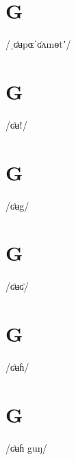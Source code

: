 \documentclass[10pt,a4paper,twoside]{book}
\begin{document}
\section*{G}

\begin{multicols}{3}
 {/ˌʛʉpɶˈʛʌmɵtʼ/} {}
\end{multicols}

\section*{G}

\begin{multicols}{3}
 {/ʛʉǃ/} {}
\end{multicols}

\section*{G}

\begin{multicols}{3}
 {/ʛʉg/} {}
\end{multicols}

\section*{G}

\begin{multicols}{3}
 {/ʛʉʛ/} {}
\end{multicols}

\section*{G}

\begin{multicols}{3}
 {/ʛʉɦ/} {}
\end{multicols}

\section*{G}

\begin{multicols}{3}
 {/ʛʉɦ guŋ/} {}
\end{multicols}
\end{document}
